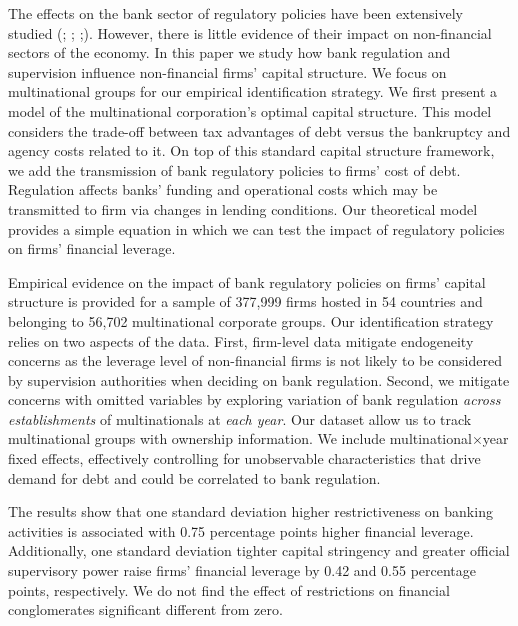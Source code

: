 \documentclass[12pt]{article}
\begin{document}
	The effects on the bank sector of regulatory policies have been extensively studied (\cite*{barth2013}; \cite*{anginer2014does};  \cite*{caprio2014macro};\cite*{demirguc2013bank}). However, there is little evidence of their impact on non-financial sectors of the economy. In this paper we study how bank regulation and supervision influence non-financial firms' capital structure. We focus on multinational groups for our empirical identification strategy. We first present a model of the multinational corporation's optimal capital structure. This model considers the trade-off between tax advantages of debt versus the bankruptcy and agency costs related to it. On top of this standard capital structure framework, we add the transmission of bank regulatory policies to firms' cost of debt. Regulation affects banks' funding and operational costs which may be transmitted to firm via changes in lending conditions. Our theoretical model provides a simple equation in which we can test the impact of regulatory policies on firms' financial leverage. 
	
	Empirical evidence on the impact of bank regulatory policies on firms' capital structure is provided for a sample of 377,999 firms hosted in 54 countries and belonging to 56,702 multinational corporate groups. Our identification strategy relies on two aspects of the data. First, firm-level data mitigate endogeneity concerns as the leverage level of non-financial firms is not likely to be considered by supervision authorities when deciding on bank regulation. Second, we mitigate concerns with omitted variables by exploring variation of bank regulation \textit{across establishments} of multinationals at \textit{each year}. Our dataset allow us to track multinational groups with ownership information. We include multinational$\times$year fixed effects, effectively controlling for unobservable characteristics that drive demand for debt and could be correlated to bank regulation. 
	
	The results show that one standard deviation higher restrictiveness on banking activities is associated with 0.75 percentage points higher financial leverage. Additionally, one standard deviation tighter capital stringency and greater official supervisory power raise firms' financial leverage by 0.42 and 0.55 percentage points, respectively. We do not find the effect of restrictions on financial conglomerates significant different from zero. 
	
\end{document}
